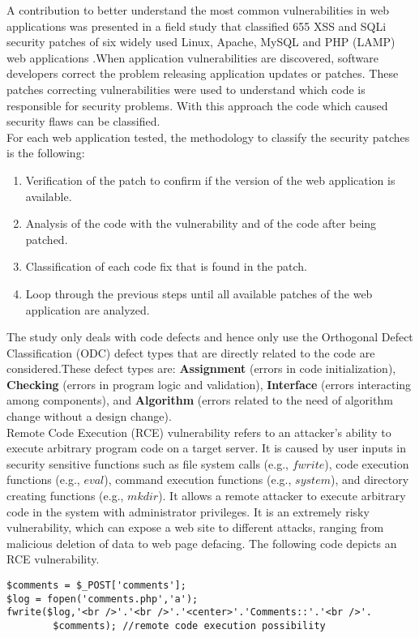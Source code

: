 A contribution to better understand the most common
vulnerabilities in web applications was presented in a field
study that classified 655 XSS and SQLi security patches of
six widely used Linux, Apache, MySQL and PHP (LAMP)
web applications \cite{16}.When application vulnerabilities are discovered,
software developers correct the problem releasing
application updates or patches. These patches correcting
vulnerabilities were used to understand
which code is responsible for security problems. With
this approach the code which caused security flaws can be classified.\\
For each web application tested, the methodology to
classify the security patches is the following:
\begin{enumerate}
	\item Verification of the patch to confirm if the version of
	the web application is available.
	\item  Analysis of the code with the vulnerability and of the
	code after being patched.
	\item  Classification of each code fix that is found in the
	patch.
	\item  Loop through the previous steps until all available
	patches of the web application are analyzed.
\end{enumerate}
The study only deals  with
code defects and hence only use the Orthogonal Defect Classification (ODC) defect types
that are directly related to the code are considered.These defect types
are: \textbf{Assignment} (errors in code
initialization), \textbf{Checking} (errors in program logic and
validation), \textbf{Interface} (errors interacting among
components), and \textbf{Algorithm} (errors related to the need
of algorithm change without a design change).\\
\newline
Remote Code Execution (RCE) vulnerability refers to an attacker's ability to execute arbitrary program code on a target server. It is caused by user inputs
in security sensitive functions such as file system calls (e.g., $ fwrite $), code execution functions (e.g., $ eval $), command execution
functions (e.g., $ system $), and directory creating functions (e.g., $ mkdir $).
It allows a remote attacker to execute arbitrary code in the system with administrator privileges. It is an extremely risky
vulnerability, which can expose a web site to different attacks, ranging from malicious deletion of data to web page defacing.
The following code depicts an RCE vulnerability.
\begin{lstlisting}
$comments = $_POST['comments'];
$log = fopen('comments.php','a');
fwrite($log,'<br />'.'<br />'.'<center>'.'Comments::'.'<br />'.
		$comments); //remote code execution possibility
\end{lstlisting}
